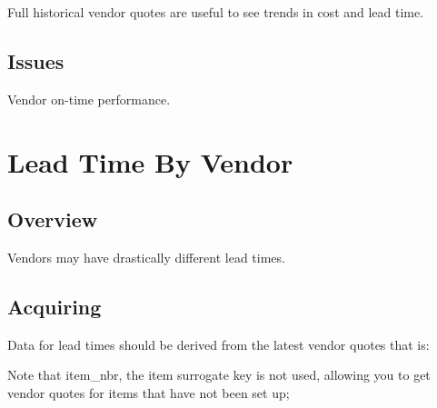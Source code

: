 \documentclass[letterpaper,10pt,english]{sphinxmanual}
\begin{document}
Full historical vendor quotes are useful to see trends in cost and lead
time.


\subsection{Issues}
\label{\detokenize{400-MultipleLeadTimes:issues}}
Vendor on-time performance.


\section{Lead Time By Vendor}
\label{\detokenize{450-MultipleLeadTimes2:lead-time-by-vendor}}\label{\detokenize{450-MultipleLeadTimes2::doc}}

\subsection{Overview}
\label{\detokenize{450-MultipleLeadTimes2:overview}}
Vendors may have drastically different lead times.


\subsection{Acquiring}
\label{\detokenize{450-MultipleLeadTimes2:acquiring}}
Data for lead times should be derived from the latest vendor quotes that is:

Note that item\_nbr, the item surrogate key is not used, allowing you to
get vendor quotes for items that have not been set up;

\begin{sphinxVerbatim}[commandchars=\\\{\}]
   
  
     
         
 
  
\end{sphinxVerbatim}
\end{document}
